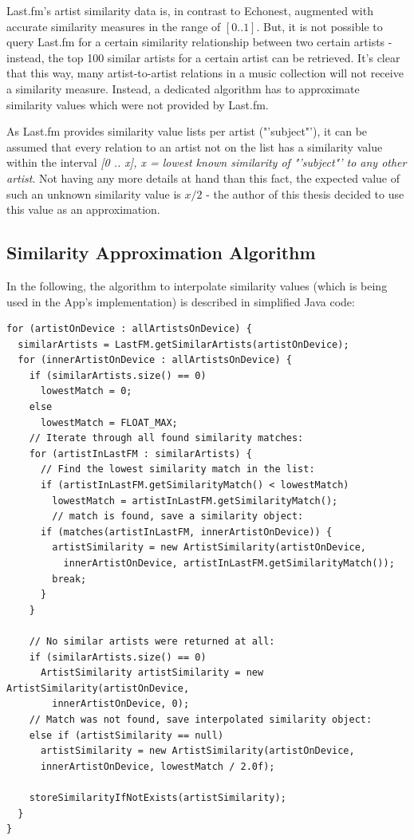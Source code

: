 Last.fm's artist similarity data is, in contrast to Echonest, augmented with accurate similarity measures in the range of $[0 .. 1]$. But, it is not possible to query Last.fm for a certain similarity relationship between two certain artists - instead, the top 100 similar artists for a certain artist can be retrieved. It's clear that this way, many artist-to-artist relations in a music collection will not receive a similarity measure. Instead, a dedicated algorithm has to approximate similarity values which were not provided by Last.fm.

As Last.fm provides similarity value lists per artist ("'subject"'), it can be assumed that every relation to an artist not on the list has a similarity value within the interval \emph{[0 .. x], x = lowest known similarity of "'subject"' to any other artist}. Not having any more details at hand than this fact, the expected value of such an unknown similarity value is $x / 2$ - the author of this thesis decided to use this value as an approximation.

\subsection{Similarity Approximation Algorithm}

In the following, the algorithm to interpolate similarity values (which is being used in the App's implementation) is described in simplified Java code:

\begin{verbatim}
for (artistOnDevice : allArtistsOnDevice) {
  similarArtists = LastFM.getSimilarArtists(artistOnDevice);
  for (innerArtistOnDevice : allArtistsOnDevice) {
    if (similarArtists.size() == 0)
      lowestMatch = 0;
    else
      lowestMatch = FLOAT_MAX;
    // Iterate through all found similarity matches:
    for (artistInLastFM : similarArtists) {
      // Find the lowest similarity match in the list:
      if (artistInLastFM.getSimilarityMatch() < lowestMatch)
        lowestMatch = artistInLastFM.getSimilarityMatch();
        // match is found, save a similarity object:
      if (matches(artistInLastFM, innerArtistOnDevice)) {
        artistSimilarity = new ArtistSimilarity(artistOnDevice, 
          innerArtistOnDevice, artistInLastFM.getSimilarityMatch());
        break;
      }
    }
	
    // No similar artists were returned at all:
    if (similarArtists.size() == 0)
      ArtistSimilarity artistSimilarity = new ArtistSimilarity(artistOnDevice, 
        innerArtistOnDevice, 0);    
    // Match was not found, save interpolated similarity object:
    else if (artistSimilarity == null)
      artistSimilarity = new ArtistSimilarity(artistOnDevice, 
      innerArtistOnDevice, lowestMatch / 2.0f);

    storeSimilarityIfNotExists(artistSimilarity);
  }
}	            
	
\end{verbatim}

